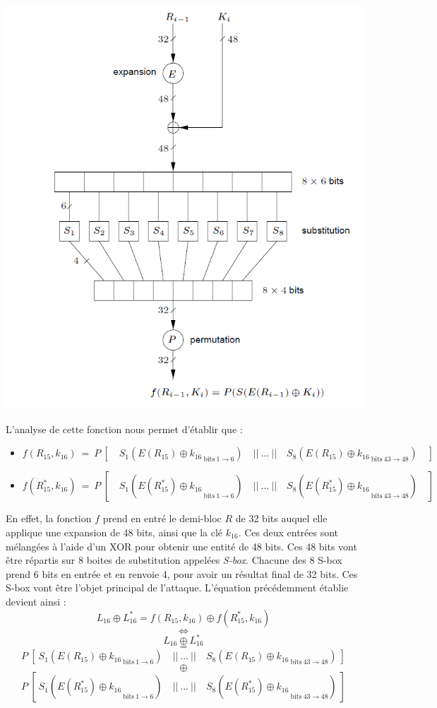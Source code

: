 		\begin{center}\includegraphics[scale=0.7]{DES_f.png}\end{center}
		
		L'analyse de cette fonction nous permet d'établir que :
		\begin{itemize}
			\item $f(R_{15}, k_{16}) \ = \ P\ [ \quad S_{1}({E(R_{15}) \oplus k_{16}}_{\ \textrm{bits}\ 1 \to 6}) \quad ||\ ...\ || \quad S_{8}({E(R_{15}) \oplus k_{16}}_{\ \textrm{bits}\ 43 \to 48}) \quad ]$			
			\item $f(R_{15}^{*}, k_{16}) \ = \ P\ [ \quad S_{1}({E(R_{15}^{*}) \oplus k_{16}}_{\ \textrm{bits}\ 1 \to 6}) \quad ||\ ...\ || \quad S_{8}({E(R_{15}^{*}) \oplus k_{16}}_{\ \textrm{bits}\ 43 \to 48}) \quad ]$
		\end{itemize}
		
		En effet, la fonction $f$ prend en entré le demi-bloc $R$ de 32 bits auquel elle applique une expansion de 48 bits, ainsi que la clé $k_{16}$. Ces deux entrées sont mélangées à l'aide d'un XOR pour obtenir une entité de 48 bits. Ces 48 bits vont être répartis sur 8 boites de substitution appelées \textit{S-box}. Chacune des 8 S-box prend 6 bits en entrée et en renvoie 4, pour avoir un résultat final de 32 bits. Ces S-box vont être l'objet principal de l'attaque. L'équation précédemment établie devient ainsi :
		\[L_{16} \oplus L_{16}^{*} = f(R_{15}, k_{16}) \oplus f(R_{15}^{*}, k_{16}) \]
		\[\Leftrightarrow\]		
		\[L_{16} \oplus L_{16}^{*}\]
		\[=\] 
		\[P\ [\ S_{1}({E(R_{15}) \oplus k_{16}}_{\ \textrm{bits}\ 1 \to 6}) \quad ||\ ...\ || \quad S_{8}({E(R_{15}) \oplus k_{16}}_{\ \textrm{bits}\ 43 \to 48})\ ] \]
		\[\oplus\] 
		\[P\ [\ S_{1}({E(R_{15}^{*}) \oplus k_{16}}_{\ \textrm{bits}\ 1 \to 6}) \quad ||\ ...\ || \quad S_{8}({E(R_{15}^{*}) \oplus k_{16}}_{\ \textrm{bits}\ 43 \to 48})\ ] \]
		
